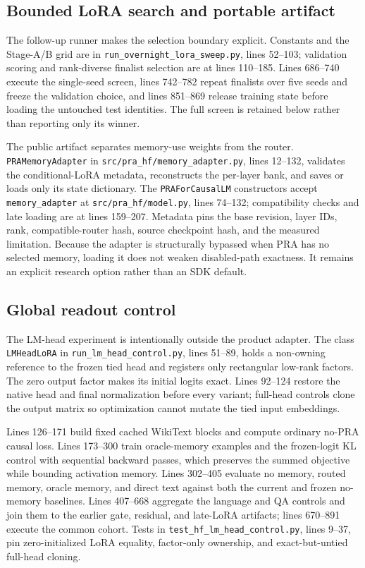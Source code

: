 \documentclass[11pt]{article}
\begin{document}
\subsection{Bounded LoRA search and portable artifact}

The follow-up runner makes the selection boundary explicit. Constants and the Stage-A/B grid are
in \texttt{run\_overnight\_lora\_sweep.py}, lines 52--103; validation scoring and rank-diverse
finalist selection are at lines 110--185. Lines 686--740 execute the single-seed screen, lines
742--782 repeat finalists over five seeds and freeze the validation choice, and lines 851--869
release training state before loading the untouched test identities. The full screen is retained
below rather than reporting only its winner.



The public artifact separates memory-use weights from the router. \texttt{PRAMemoryAdapter} in
\texttt{src/pra\_hf/memory\_adapter.py}, lines 12--132, validates the conditional-LoRA metadata,
reconstructs the per-layer bank, and saves or loads only its state dictionary. The
\texttt{PRAForCausalLM} constructors accept \texttt{memory\_adapter} at
\texttt{src/pra\_hf/model.py}, lines 74--132; compatibility checks and late loading are at lines
159--207. Metadata pins the base revision, layer IDs, rank, compatible-router hash, source
checkpoint hash, and the measured limitation. Because the adapter is structurally bypassed when
PRA has no selected memory, loading it does not weaken disabled-path exactness. It remains an
explicit research option rather than an SDK default.

\subsection{Global readout control}

The LM-head experiment is intentionally outside the product adapter. The class
\texttt{LMHeadLoRA} in \texttt{run\_lm\_head\_control.py}, lines 51--89, holds a non-owning
reference to the frozen tied head and registers only rectangular low-rank factors. The zero
output factor makes its initial logits exact. Lines 92--124 restore the native head and final
normalization before every variant; full-head controls clone the output matrix so optimization
cannot mutate the tied input embeddings.

Lines 126--171 build fixed cached WikiText blocks and compute ordinary no-PRA causal loss. Lines
173--300 train oracle-memory examples and the frozen-logit KL control with sequential backward
passes, which preserves the summed objective while bounding activation memory. Lines 302--405
evaluate no memory, routed memory, oracle memory, and direct text against both the current and
frozen no-memory baselines. Lines 407--668 aggregate the language and QA controls and join them to
the earlier gate, residual, and late-LoRA artifacts; lines 670--891 execute the common cohort.
Tests in \texttt{test\_hf\_lm\_head\_control.py}, lines 9--37, pin zero-initialized LoRA
equality, factor-only ownership, and exact-but-untied full-head cloning.
\end{document}
